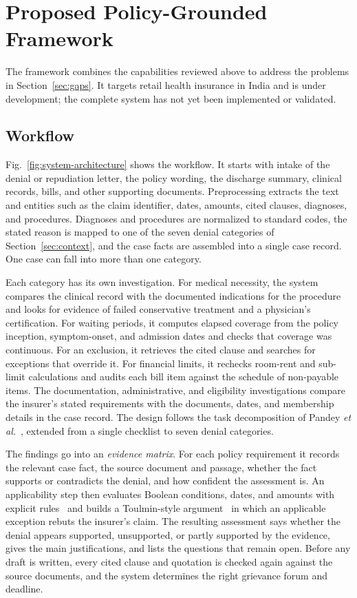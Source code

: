 \documentclass[conference]{IEEEtran}
\begin{document}
\section{Proposed Policy-Grounded Framework}
\label{sec:framework}
The framework combines the capabilities reviewed above to address the problems in Section~\ref{sec:gaps}. It targets retail health insurance in India and is under development; the complete system has not yet been implemented or validated.

\subsection{Workflow}
Fig.~\ref{fig:system-architecture} shows the workflow. It starts with intake of the denial or repudiation letter, the policy wording, the discharge summary, clinical records, bills, and other supporting documents. Preprocessing extracts the text and entities such as the claim identifier, dates, amounts, cited clauses, diagnoses, and procedures. Diagnoses and procedures are normalized to standard codes, the stated reason is mapped to one of the seven denial categories of Section~\ref{sec:context}, and the case facts are assembled into a single case record. One case can fall into more than one category.

Each category has its own investigation. For medical necessity, the system compares the clinical record with the documented indications for the procedure and looks for evidence of failed conservative treatment and a physician's certification. For waiting periods, it computes elapsed coverage from the policy inception, symptom-onset, and admission dates and checks that coverage was continuous. For an exclusion, it retrieves the cited clause and searches for exceptions that override it. For financial limits, it rechecks room-rent and sub-limit calculations and audits each bill item against the schedule of non-payable items. The documentation, administrative, and eligibility investigations compare the insurer's stated requirements with the documents, dates, and membership details in the case record. The design follows the task decomposition of Pandey \textit{et al.}~\cite{pandey2024}, extended from a single checklist to seven denial categories.

The findings go into an \emph{evidence matrix}. For each policy requirement it records the relevant case fact, the source document and passage, whether the fact supports or contradicts the denial, and how confident the assessment is. An applicability step then evaluates Boolean conditions, dates, and amounts with explicit rules~\cite{pokharel2026} and builds a Toulmin-style argument~\cite{inslogicbench2026} in which an applicable exception rebuts the insurer's claim. The resulting assessment says whether the denial appears supported, unsupported, or partly supported by the evidence, gives the main justifications, and lists the questions that remain open. Before any draft is written, every cited clause and quotation is checked again against the source documents, and the system determines the right grievance forum and deadline.
\end{document}

